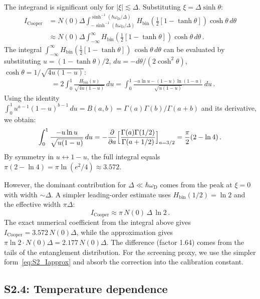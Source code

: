 \documentclass[prb,twocolumn,superscriptaddress,longbibliography,floatfix]{revtex4-2}
\newcommand{\Icoop}{I_{\mathrm{Cooper}}}
\newcommand{\oD}{\omega_{\mathrm{D}}}
\begin{document}
The integrand is significant only for $|\xi| \lesssim \Delta$.
Substituting $\xi = \Delta\sinh\theta$:
\begin{align}
  \Icoop &= N(0)\Delta \int_{-\sinh^{-1}(\hbar\oD/\Delta)}
  ^{\sinh^{-1}(\hbar\oD/\Delta)}
  H_{\mathrm{bin}}\!\left(\frac{1}{2}[1 - \tanh\theta]\right)
  \cosh\theta\, d\theta \nonumber\\
  &\approx N(0)\Delta \int_{-\infty}^{\infty}
  H_{\mathrm{bin}}\!\left(\frac{1}{2}[1 - \tanh\theta]\right)
  \cosh\theta\, d\theta\,.
\end{align}
The integral $\int_{-\infty}^{\infty}
H_{\mathrm{bin}}(\frac{1}{2}[1-\tanh\theta])\, \cosh\theta\, d\theta$
can be evaluated by substituting $u = (1-\tanh\theta)/2$,
$du = -d\theta/(2\cosh^2\theta)$, $\cosh\theta = 1/\sqrt{4u(1-u)}$:
\begin{align}
  &= 2\int_0^1 \frac{H_{\mathrm{bin}}(u)}{\sqrt{4u(1-u)}}\, du
  = \int_0^1 \frac{-u\ln u - (1-u)\ln(1-u)}{\sqrt{u(1-u)}}\, du\,.
\end{align}
Using the identity
$\int_0^1 u^{a-1}(1-u)^{b-1}\, du = B(a,b) = \Gamma(a)\Gamma(b)/\Gamma(a+b)$
and its derivative, we obtain:
\begin{equation}
  \int_0^1 \frac{-u\ln u}{\sqrt{u(1-u)}}\, du
  = -\frac{\partial}{\partial a}\Bigl[\frac{\Gamma(a)\Gamma(1/2)}{\Gamma(a+1/2)}\Bigr]_{a=3/2}
  = \frac{\pi}{2}(2 - \ln 4)\,.
\end{equation}
By symmetry in $u \leftrightarrow 1-u$, the full integral equals
$\pi(2 - \ln 4) = \pi\ln(e^2/4) \approx 3.572$.

However, the dominant contribution for $\Delta \ll \hbar\oD$
comes from the peak at $\xi = 0$ with width $\sim \Delta$.
A simpler leading-order estimate uses
$H_{\mathrm{bin}}(1/2) = \ln 2$ and the effective width
$\pi\Delta$:
\begin{equation}\label{eq:S2_Iapprox}
  \boxed{\Icoop \approx \pi\, N(0)\, \Delta\, \ln 2\,.}
\end{equation}
The exact numerical coefficient from the integral above gives
$\Icoop = 3.572\, N(0)\Delta$, while the approximation gives
$\pi\ln 2 \cdot N(0)\Delta = 2.177\, N(0)\Delta$.  The
difference (factor 1.64) comes from the tails of the
entanglement distribution.  For the screening proxy, we use
the simpler form~\eqref{eq:S2_Iapprox} and absorb the
correction into the calibration constant.

\subsection{S2.4: Temperature dependence}
\end{document}
